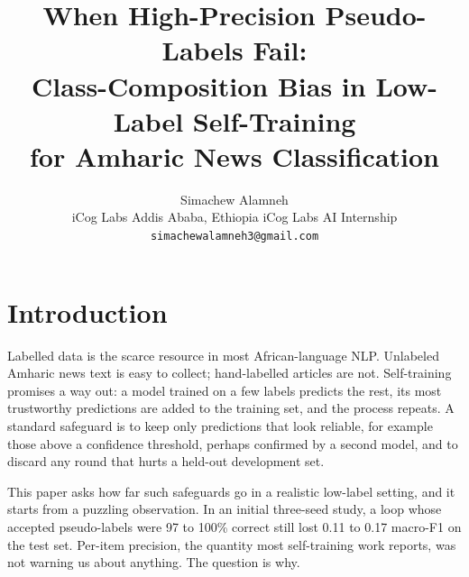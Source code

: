 \documentclass[11pt]{article}
\title{When High-Precision Pseudo-Labels Fail:\\
Class-Composition Bias in Low-Label Self-Training\\
for Amharic News Classification}
\author{Simachew Alamneh\\
\small iCog Labs Addis Ababa, Ethiopia \;\textbar\; iCog Labs AI Internship\\
\small \texttt{simachewalamneh3@gmail.com}}
\date{}
\begin{document}
\maketitle


\section{Introduction}
Labelled data is the scarce resource in most African-language NLP. Unlabeled Amharic news text is easy to collect; hand-labelled articles are not. Self-training promises a way out: a model trained on a few labels predicts the rest, its most trustworthy predictions are added to the training set, and the process repeats. A standard safeguard is to keep only predictions that look reliable, for example those above a confidence threshold, perhaps confirmed by a second model, and to discard any round that hurts a held-out development set.

This paper asks how far such safeguards go in a realistic low-label setting, and it starts from a puzzling observation. In an initial three-seed study, a loop whose accepted pseudo-labels were 97 to 100\% correct still lost 0.11 to 0.17 macro-F1 on the test set. Per-item precision, the quantity most self-training work reports, was not warning us about anything. The question is why.
\end{document}
